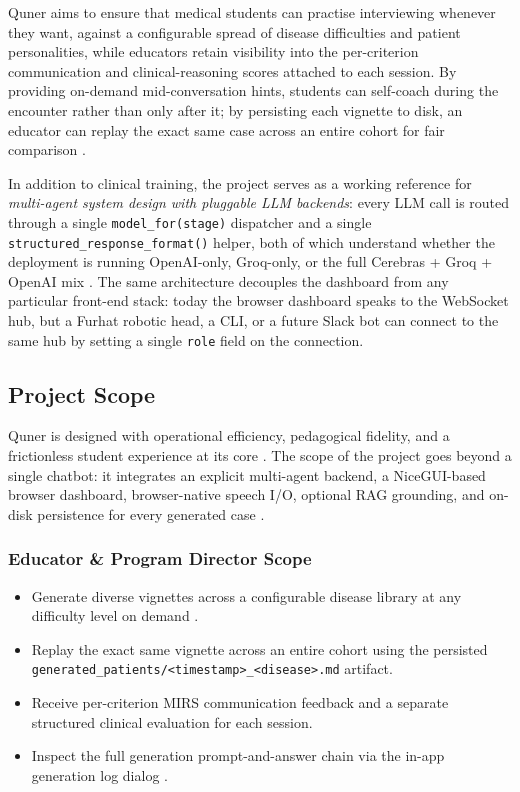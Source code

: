 \documentclass{article}
\begin{document}
Quner aims to ensure that medical students can practise interviewing whenever they want, against a configurable spread of disease difficulties and patient personalities, while educators retain visibility into the per-criterion communication and clinical-reasoning scores attached to each session. By providing on-demand mid-conversation hints, students can self-coach during the encounter rather than only after it; by persisting each vignette to disk, an educator can replay the exact same case across an entire cohort for fair comparison \cite{Zhao2023ASO,Jing2024WhenLL}.

In addition to clinical training, the project serves as a working reference for \emph{multi-agent system design with pluggable LLM backends}: every LLM call is routed through a single \texttt{model\_for(stage)} dispatcher and a single \texttt{structured\_response\_format()} helper, both of which understand whether the deployment is running OpenAI-only, Groq-only, or the full Cerebras + Groq + OpenAI mix \cite{Cheptsov2013IntroducingAN,Monir2024VectorSearchED}. The same architecture decouples the dashboard from any particular front-end stack: today the browser dashboard speaks to the WebSocket hub, but a Furhat robotic head, a CLI, or a future Slack bot can connect to the same hub by setting a single \texttt{role} field on the connection.

\subsection{Project Scope}

Quner is designed with operational efficiency, pedagogical fidelity, and a frictionless student experience at its core \cite{Portovaras2024CurrentTA}. The scope of the project goes beyond a single chatbot: it integrates an explicit multi-agent backend, a NiceGUI-based browser dashboard, browser-native speech I/O, optional RAG grounding, and on-disk persistence for every generated case \cite{Topsakal2023CreatingLL}.

\subsubsection*{Educator \& Program Director Scope}
\begin{itemize}
    \item Generate diverse vignettes across a configurable disease library at any difficulty level on demand \cite{Zhao2023ASO}.
    \item Replay the exact same vignette across an entire cohort using the persisted \texttt{generated\_patients/<timestamp>\_<disease>.md} artifact.
    \item Receive per-criterion MIRS communication feedback and a separate structured clinical evaluation for each session.
    \item Inspect the full generation prompt-and-answer chain via the in-app generation log dialog \cite{Mahajan2022TextualDQ}.
\end{itemize}
\end{document}
